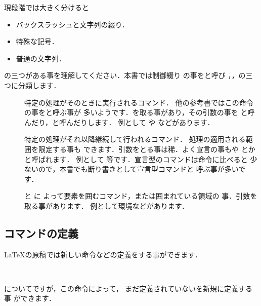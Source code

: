 現段階では大きく分けると
\begin{itemize}
 \item バックスラッシュと文字列の綴り．
 \item 特殊な記号．%
 \item 普通の文字列．
\end{itemize}
の三つがある事を理解してください．本書では制御綴り
の事をと呼び
，，の三つに分類します．
\begin{description}
\item[] 
   特定の処理がそのときに実行されるコマンド．
   他の参考書ではこの命令の事をと呼ぶ事が
   多いようです．を取る事があり，その引数の事を
   と呼んだり，と呼んだりします．
   例として  や などがあります．

\item[] 
   特定の処理がそれ以降継続して行われるコマンド．
   処理の適用される範囲を限定する事も
   できます．引数をとる事は稀．よく宣言の事もや
   とかと呼ばれます．
   例として 等です．宣言型のコマンドは命令に比べると
   少ないので，本書でも断り書きとして宣言型コマンドと
   呼ぶ事が多いです．

\item[] 
   と  に
  よって要素を囲むコマンド，または囲まれている領域の
  事．引数を取る事があります．
  例として環境などがあります．
\end{description}


\subsection{コマンドの定義}
%
%
{\LaTeX}の原稿では新しい命令などの定義をする事ができます．
\begin{Syntax}
\\
\end{Syntax}
についてですが，この命令によって，
まだ定義されていないを新規に定義する事
ができます．


